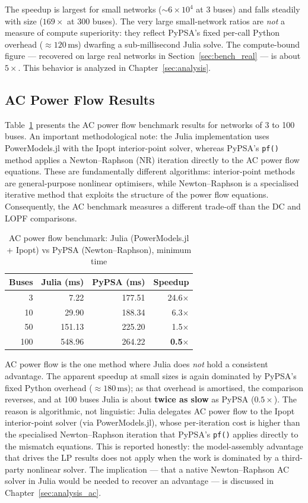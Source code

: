 The speedup is largest for small networks ($\sim$$6\times10^{4}$ at 3 buses) and falls steadily with size ($169\times$ at 300 buses). The very large small-network ratios are \emph{not} a measure of compute superiority: they reflect PyPSA's fixed per-call Python overhead ($\approx 120\,\text{ms}$) dwarfing a sub-millisecond Julia solve. The compute-bound figure --- recovered on large real networks in Section~\ref{sec:bench_real} --- is about $5\times$. This behavior is analyzed in Chapter~\ref{sec:analysis}.

\subsection{AC Power Flow Results}

Table~\ref{tab:ac_benchmark} presents the AC power flow benchmark results for networks of 3 to 100 buses. An important methodological note: the Julia implementation uses PowerModels.jl with the Ipopt interior-point solver, whereas PyPSA's \texttt{pf()} method applies a Newton--Raphson (NR) iteration directly to the AC power flow equations. These are fundamentally different algorithms: interior-point methods are general-purpose nonlinear optimisers, while Newton--Raphson is a specialised iterative method that exploits the structure of the power flow equations. Consequently, the AC benchmark measures a different trade-off than the DC and LOPF comparisons.

\begin{table}[H]
\centering
\caption{AC power flow benchmark: Julia (PowerModels.jl + Ipopt) vs PyPSA (Newton--Raphson), minimum time}
\label{tab:ac_benchmark}
\begin{tabular}{rrrr}
\toprule
\textbf{Buses} & \textbf{Julia (ms)} & \textbf{PyPSA (ms)} & \textbf{Speedup} \\
\midrule
   3 &   7.22 & 177.51 & 24.6$\times$ \\
  10 &  29.90 & 188.34 &  6.3$\times$ \\
  50 & 151.13 & 225.20 &  1.5$\times$ \\
 100 & 548.96 & 264.22 &  \textbf{0.5$\times$} \\
\bottomrule
\end{tabular}
\end{table}

AC power flow is the one method where Julia does \emph{not} hold a consistent advantage. The apparent speedup at small sizes is again dominated by PyPSA's fixed Python overhead ($\approx 180\,\text{ms}$); as that overhead is amortised, the comparison reverses, and at 100 buses Julia is about \textbf{twice as slow} as PyPSA ($0.5\times$). The reason is algorithmic, not linguistic: Julia delegates AC power flow to the Ipopt interior-point solver (via PowerModels.jl), whose per-iteration cost is higher than the specialised Newton--Raphson iteration that PyPSA's \texttt{pf()} applies directly to the mismatch equations. This is reported honestly: the model-assembly advantage that drives the LP results does not apply when the work is dominated by a third-party nonlinear solver. The implication --- that a native Newton--Raphson AC solver in Julia would be needed to recover an advantage --- is discussed in Chapter~\ref{sec:analysis_ac}.

